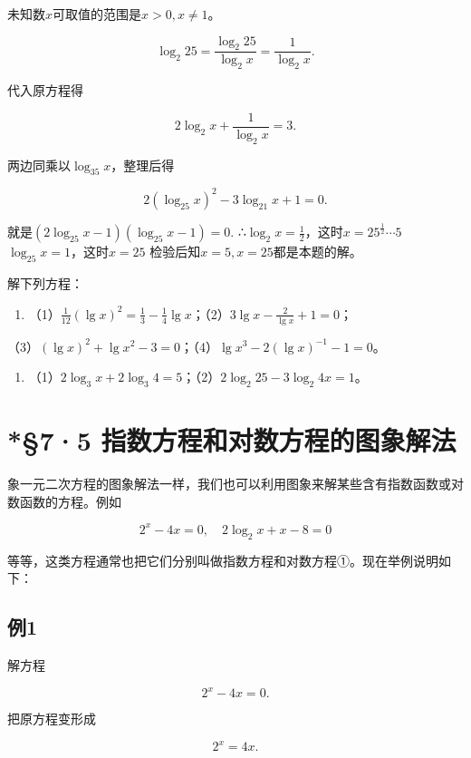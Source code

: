  未知数\(x\)可取值的范围是\(x > 0, x \neq 1\)。

\[
\log_{2} 25 = \frac{\log_{2} 25}{\log_{2} x} = \frac{1}{\log_{2} x}.
\]

代入原方程得

\[
2 \log_{2} x + \frac{1}{\log_{2} x} = 3.
\]

两边同乘以\(\log_{35}x\)，整理后得

\[
2 \left(\log_{25} x\right)^{2} - 3 \log_{21} x + 1 = 0.
\]

就是\((2\log_{25}x - 1)(\log_{25}x - 1) = 0.\)
∴\(\log_{2}x=\frac{1}{2}\)，这时\(x=25^{\frac{1}{2}}\cdots5\)
\(\log_{25}x = 1\)，这时\(x = 25\)
检验后知\(x = 5, x = 25\)都是本题的解。

解下列方程：

\begin{enumerate}
\item
  （1）\(\frac{1}{12} (\lg x)^2 = \frac{1}{3} - \frac{1}{4} \lg x\)；（2）\(3 \lg x - \frac{2}{\lg x} + 1 = 0\)；
\end{enumerate}

（3）\((\lg x)^2 + \lg x^2 - 3 = 0\)；（4）\(\lg x^3 - 2(\lg x)^{-1} - 1 = 0\)。

\begin{enumerate}[start=2]
\item
  （1）\(2\log_{3}x + 2\log_{3}4 = 5\)；（2）\(2\log_{2}25 - 3\log_{2}4x = 1\)。
\end{enumerate}

\section{*§7·5 指数方程和对数方程的图象解法}

象一元二次方程的图象解法一样，我们也可以利用图象来解某些含有指数函数或对数函数的方程。例如

\[
2^{x} - 4 x = 0, \quad 2 \log_{2} x + x - 8 = 0
\]

等等，这类方程通常也把它们分别叫做指数方程和对数方程①。现在举例说明如下：

\subsection{例1}

解方程

\[
2^{x} - 4 x = 0.
\]

 把原方程变形成

\[
2^{x} = 4 x.
\]

